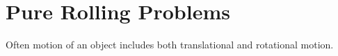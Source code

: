 \section{Pure Rolling Problems}
%
Often motion of an object includes both translational and rotational motion.
%
%
%
%

